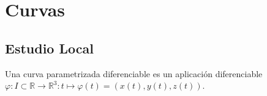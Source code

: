 \part{Curvas}
\chapter{Estudio Local}

\begin{defn}
  Una curva parametrizada diferenciable es un aplicación diferenciable $\varphi: I \subset \mathbb{R} \to \mathbb{R}^{3} : t \mapsto  \varphi(t) = (x(t), y(t), z(t))$.
\end{defn}

\begin{obs}

\end{obs}
